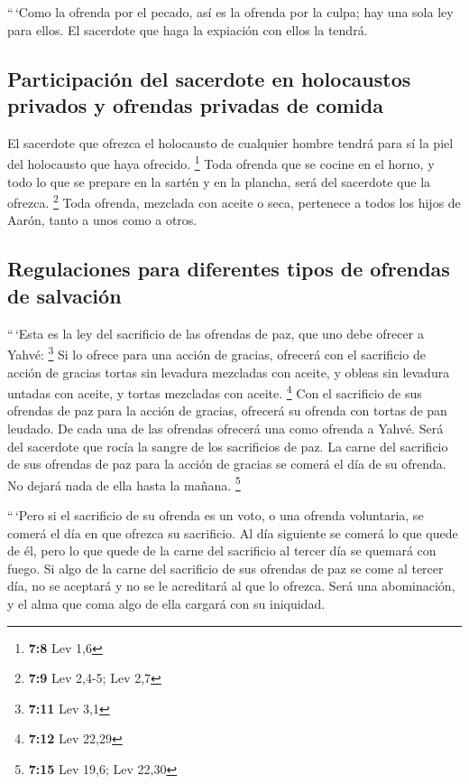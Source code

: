 \begin{paracol}{2}
 ``\,`Como la ofrenda por el pecado, así es la ofrenda por
la culpa; hay una sola ley para ellos. El sacerdote que haga la
expiación con ellos la tendrá.

\hypertarget{participaciuxf3n-del-sacerdote-en-holocaustos-privados-y-ofrendas-privadas-de-comida}{%
\subsection{Participación del sacerdote en holocaustos privados y
ofrendas privadas de
comida}\label{participaciuxf3n-del-sacerdote-en-holocaustos-privados-y-ofrendas-privadas-de-comida}}

 El sacerdote que ofrezca el holocausto de cualquier
hombre tendrá para sí la piel del holocausto que haya ofrecido.
\footnote{\textbf{7:8} Lev 1,6}  Toda ofrenda que se
cocine en el horno, y todo lo que se prepare en la sartén y en la
plancha, será del sacerdote que la ofrezca. \footnote{\textbf{7:9} Lev
  2,4-5; Lev 2,7}  Toda ofrenda, mezclada con aceite o
seca, pertenece a todos los hijos de Aarón, tanto a unos como a otros.

\hypertarget{regulaciones-para-diferentes-tipos-de-ofrendas-de-salvaciuxf3n}{%
\subsection{Regulaciones para diferentes tipos de ofrendas de
salvación}\label{regulaciones-para-diferentes-tipos-de-ofrendas-de-salvaciuxf3n}}

 ``\,`Esta es la ley del sacrificio de las ofrendas de
paz, que uno debe ofrecer a Yahvé: \footnote{\textbf{7:11} Lev 3,1}
 Si lo ofrece para una acción de gracias, ofrecerá con el
sacrificio de acción de gracias tortas sin levadura mezcladas con
aceite, y obleas sin levadura untadas con aceite, y tortas mezcladas con
aceite. \footnote{\textbf{7:12} Lev 22,29}  Con el
sacrificio de sus ofrendas de paz para la acción de gracias, ofrecerá su
ofrenda con tortas de pan leudado.  De cada una de las
ofrendas ofrecerá una como ofrenda a Yahvé. Será del sacerdote que rocía
la sangre de los sacrificios de paz.  La carne del
sacrificio de sus ofrendas de paz para la acción de gracias se comerá el
día de su ofrenda. No dejará nada de ella hasta la mañana. \footnote{\textbf{7:15}
  Lev 19,6; Lev 22,30}

 ``\,`Pero si el sacrificio de su ofrenda es un voto, o
una ofrenda voluntaria, se comerá el día en que ofrezca su sacrificio.
Al día siguiente se comerá lo que quede de él,  pero lo
que quede de la carne del sacrificio al tercer día se quemará con fuego.
 Si algo de la carne del sacrificio de sus ofrendas de
paz se come al tercer día, no se aceptará y no se le acreditará al que
lo ofrezca. Será una abominación, y el alma que coma algo de ella
cargará con su iniquidad.


\end{paracol}
